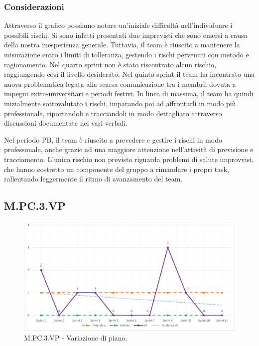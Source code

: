 \documentclass[10pt, a4paper]{article}
\begin{document}
\subsubsection{Considerazioni}
Attraverso il grafico possiamo notare un'iniziale difficoltà nell'individuare i possibili rischi.
Si sono infatti presentati due imprevisti che sono emersi a causa della nostra inesperienza generale.
Tuttavia, il team è riuscito a mantenere la misurazione entro i limiti di tolleranza, gestendo i rischi pervenuti con metodo e ragionamento.
Nel quarto sprint non è stato riscontrato alcun rischio, raggiungendo così il livello desiderato.
Nel quinto sprint il team ha incontrato una nuova problematica legata alla scarsa comunicazione tra i membri, dovuta a impegni extra-universitari e periodi festivi.
In linea di massima, il team ha quindi inizialmente sottovalutato i rischi, imparando poi ad affrontarli in modo più professionale, riportandoli e tracciandoli in modo dettagliato attraverso discussioni documentate nei vari verbali.

Nel periodo PB, il team è riuscito a prevedere e gestire i rischi in modo professonale, anche grazie ad una maggiore attenzione nell'attività di previsione e tracciamento. L'unico rischio non previsto riguarda problemi di salute improvvisi, che hanno costretto un componente del gruppo a rimandare i propri task, rallentando leggermente il ritmo di avanzamento del team.

\subsection{M.PC.3.VP}
\begin{figure}[H]
\includegraphics[width=15.5cm]{img/metriche/MPC3VP.png}
\caption{M.PC.3.VP - Variazione di piano.}
\end{figure}
\end{document}
